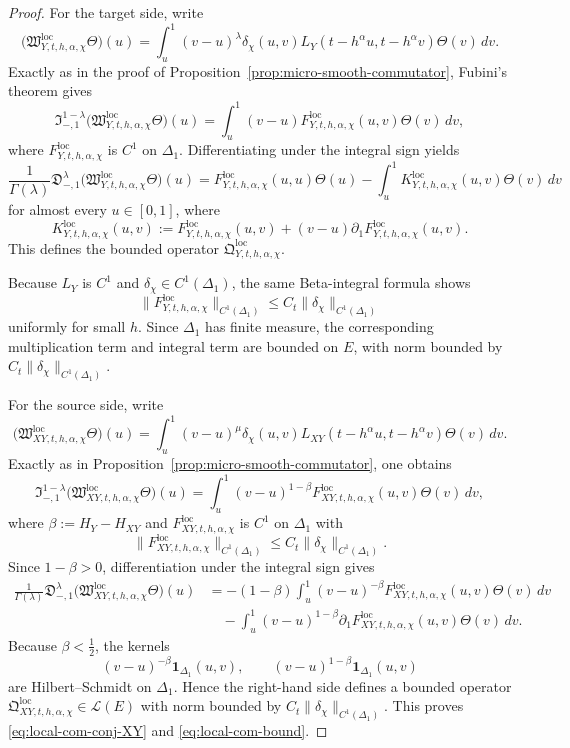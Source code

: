 \documentclass[11pt,a4paper]{amsart}
\theoremstyle{plain}
\theoremstyle{definition}
\theoremstyle{remark}
\newcommand{\one}{\mathbf 1}
\begin{document}
\begin{proof}
For the target side, write
\[
\bigl(
\mathfrak W_{Y,t,h,\alpha,\chi}^{\mathrm{loc}}\Theta
\bigr)(u)
=
\int_u^1
(v-u)^{\lambda}
\delta_\chi(u,v)
L_Y(t-h^\alpha u,t-h^\alpha v)\Theta(v)\,dv.
\]
Exactly as in the proof of Proposition~\ref{prop:micro-smooth-commutator}, Fubini's theorem gives
\[
\mathfrak I_{-,1}^{1-\lambda}
\bigl(
\mathfrak W_{Y,t,h,\alpha,\chi}^{\mathrm{loc}}\Theta
\bigr)(u)
=
\int_u^1
(v-u)
F_{Y,t,h,\alpha,\chi}^{\mathrm{loc}}(u,v)\Theta(v)\,dv,
\]
where \(F_{Y,t,h,\alpha,\chi}^{\mathrm{loc}}\) is \(C^1\) on \(\Delta_1\). Differentiating under
the integral sign yields
\[
\frac{1}{\Gamma(\lambda)}
\mathfrak D_{-,1}^{\lambda}
\bigl(
\mathfrak W_{Y,t,h,\alpha,\chi}^{\mathrm{loc}}\Theta
\bigr)(u)
=
F_{Y,t,h,\alpha,\chi}^{\mathrm{loc}}(u,u)\Theta(u)
-\int_u^1
K_{Y,t,h,\alpha,\chi}^{\mathrm{loc}}(u,v)\Theta(v)\,dv
\]
for almost every \(u\in[0,1]\), where
\[
K_{Y,t,h,\alpha,\chi}^{\mathrm{loc}}(u,v)
:=
F_{Y,t,h,\alpha,\chi}^{\mathrm{loc}}(u,v)
+(v-u)\partial_1F_{Y,t,h,\alpha,\chi}^{\mathrm{loc}}(u,v).
\]
This defines the bounded operator \(\mathfrak Q_{Y,t,h,\alpha,\chi}^{\mathrm{loc}}\).

Because \(L_Y\) is \(C^1\) and \(\delta_\chi\in C^1(\Delta_1)\), the same Beta-integral formula
shows
\[
\|F_{Y,t,h,\alpha,\chi}^{\mathrm{loc}}\|_{C^1(\Delta_1)}
\le
C_t\|\delta_\chi\|_{C^1(\Delta_1)}
\]
uniformly for small \(h\). Since \(\Delta_1\) has finite measure, the corresponding multiplication
term and integral term are bounded on \(E\), with norm bounded by
\(C_t\|\delta_\chi\|_{C^1(\Delta_1)}\).

For the source side, write
\[
\bigl(
\mathfrak W_{XY,t,h,\alpha,\chi}^{\mathrm{loc}}\Theta
\bigr)(u)
=
\int_u^1
(v-u)^{\mu}
\delta_\chi(u,v)
L_{XY}(t-h^\alpha u,t-h^\alpha v)\Theta(v)\,dv.
\]
Exactly as in Proposition~\ref{prop:micro-smooth-commutator}, one obtains
\[
\mathfrak I_{-,1}^{1-\lambda}
\bigl(
\mathfrak W_{XY,t,h,\alpha,\chi}^{\mathrm{loc}}\Theta
\bigr)(u)
=
\int_u^1
(v-u)^{1-\beta}
F_{XY,t,h,\alpha,\chi}^{\mathrm{loc}}(u,v)\Theta(v)\,dv,
\]
where \(\beta:=H_Y-H_{XY}\) and \(F_{XY,t,h,\alpha,\chi}^{\mathrm{loc}}\) is \(C^1\) on
\(\Delta_1\) with
\[
\|F_{XY,t,h,\alpha,\chi}^{\mathrm{loc}}\|_{C^1(\Delta_1)}
\le
C_t\|\delta_\chi\|_{C^1(\Delta_1)}.
\]
Since \(1-\beta>0\), differentiation under the integral sign gives
\begin{align*}
\frac{1}{\Gamma(\lambda)}
\mathfrak D_{-,1}^{\lambda}
\bigl(
\mathfrak W_{XY,t,h,\alpha,\chi}^{\mathrm{loc}}\Theta
\bigr)(u)
&=
-(1-\beta)
\int_u^1
(v-u)^{-\beta}
F_{XY,t,h,\alpha,\chi}^{\mathrm{loc}}(u,v)\Theta(v)\,dv\\
&\quad-
\int_u^1
(v-u)^{1-\beta}
\partial_1F_{XY,t,h,\alpha,\chi}^{\mathrm{loc}}(u,v)\Theta(v)\,dv.
\end{align*}
Because \(\beta<\tfrac12\), the kernels
\[
(v-u)^{-\beta}\one_{\Delta_1}(u,v),
\qquad
(v-u)^{1-\beta}\one_{\Delta_1}(u,v)
\]
are Hilbert--Schmidt on \(\Delta_1\). Hence the right-hand side defines a bounded operator
\(\mathfrak Q_{XY,t,h,\alpha,\chi}^{\mathrm{loc}}\in\mathcal L(E)\) with norm bounded by
\(C_t\|\delta_\chi\|_{C^1(\Delta_1)}\). This proves \eqref{eq:local-com-conj-XY} and
\eqref{eq:local-com-bound}.
\end{proof}
\end{document}
